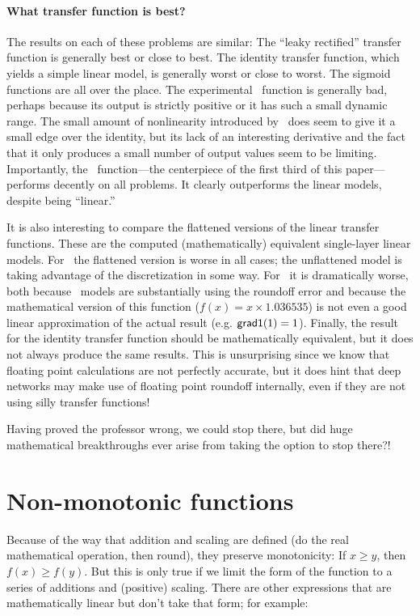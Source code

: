 \documentclass[twocolumn]{article}
\begin{document}
\paragraph{What transfer function is best?}
The results on each of these problems are similar: The ``leaky
rectified'' transfer function is generally best or close to best.
The identity transfer function, which yields a simple linear model,
is generally worst or close to worst. The sigmoid functions are
all over the place. The experimental \downshifttwo\ function is
generally bad, perhaps because its output is strictly positive or
it has such a small dynamic range. The small amount of nonlinearity
introduced by \plussixtyfour\ does seem to give it a small edge
over the identity, but its lack of an interesting derivative and
the fact that it only produces a small number of output values seem
to be limiting. Importantly, the \gradone\ function---the
centerpiece of the first third of this paper---performs decently on
all problems. It clearly outperforms the linear models, despite
being ``linear.''

It is also interesting to compare the flattened versions of the linear
transfer functions. These are the computed (mathematically) equivalent
single-layer linear models. For \plussixtyfour\ the flattened version
is worse in all cases; the unflattened model is taking advantage of
the discretization in some way. For \gradone\ it is dramatically
worse, both because \gradone\ models are substantially using the
roundoff error and because the mathematical version of this function
($f(x) = x \times 1.036535$) is not even a good linear approximation
of the actual result (e.g. ${\sf grad1}(1) = 1$). Finally, the result
for the identity transfer function should be mathematically equivalent,
but it does not always produce the same results. This is unsurprising
since we know that floating point calculations are not perfectly
accurate, but it does hint that deep networks may make use of
floating point roundoff internally, even if they are not using silly
transfer functions!

\smallskip
Having proved the professor wrong, we could stop there, but did huge
mathematical breakthroughs ever arise from taking the option to stop
there?!


\section{Non-monotonic functions}
Because of the way that addition and scaling are defined (do the real
mathematical operation, then round), they preserve monotonicity: If $x
\geq y$, then $f(x) \geq f(y)$. But this is only true if we limit the
form of the function to a series of additions and (positive) scaling.
There are other expressions that are mathematically linear but don't
take that form; for example:
\end{document}
